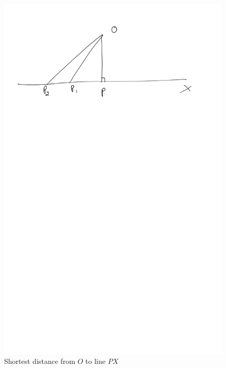 \begin{figure}[!h]
	\begin{center}
		
		\includegraphics[width=\columnwidth]{./figs/ch4_short_dist}
		\vspace*{-10cm}
	\end{center}
	\caption{Shortest distance from $O$ to line $PX$}
	\label{ch4_short_dist}	
\end{figure}

